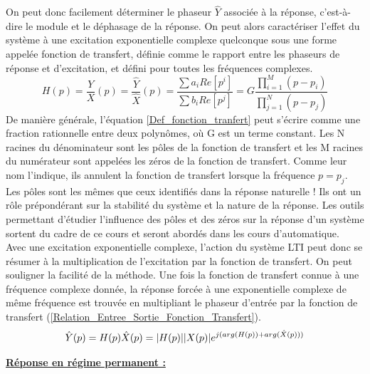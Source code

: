 	On peut donc facilement déterminer le phaseur $\hat{Y}$
        associée à la réponse, c'est-à-dire le module et le déphasage
        de la réponse.  On peut alors caractériser l'effet du système
        à une excitation exponentielle complexe quelconque sous une
        forme appelée fonction de transfert, définie comme le rapport
        entre les phaseurs de réponse et d'excitation, et défini pour
        toutes les fréquences complexes.
	\begin{equation}\label{Def_fonction_tranfert}
          H(p) = \frac{Y}{X} (p) = \frac{\hat Y}{\hat X} (p)= \frac{\sum a_{i}  Re[p^{i}]}{\sum b_{i}  Re[p^{j}]}=G\frac{\prod_{i=1}^{M} (p-p_{i})}{\prod_{j=1}^{N} (p-p_{j})}
	\end{equation}
	De manière générale, l'équation \ref{Def_fonction_tranfert} peut s'écrire comme une fraction rationnelle entre deux polynômes, où G est un terme constant. Les N racines du dénominateur sont les pôles de la fonction de transfert et les M racines du numérateur sont appelées les zéros de la fonction de transfert. Comme leur nom l'indique, ils annulent la fonction de transfert lorsque la fréquence $p=p_{j}$. Les pôles sont les mêmes que ceux identifiés dans la réponse naturelle ! Ils ont un rôle prépondérant sur la stabilité du système et la nature de la réponse. Les outils permettant d'étudier l'influence des pôles et des zéros sur la réponse d'un système sortent du cadre de ce cours et seront abordés dans les cours d'automatique.\\
	
	Avec une excitation exponentielle complexe, l'action du
        système LTI peut donc se résumer à la multiplication de
        l'excitation par la fonction de transfert.  On peut souligner
        la facilité de la méthode. Une fois la fonction de transfert
        connue à une fréquence complexe donnée, la réponse forcée à
        une exponentielle complexe de même fréquence est trouvée en
        multipliant le phaseur d'entrée par la fonction de transfert
        (\ref{Relation_Entree_Sortie_Fonction_Transfert}).
	\begin{equation}\label{Relation_Entree_Sortie_Fonction_Transfert}
          \hat{Y}(p) = H(p) \hat{X}(p)=|H(p)||X(p)|e^{j(arg(H(p))+arg(\hat{X}(p)))}	
	\end{equation}
	
	\vspace{1\baselineskip}
	
	
	\textbf{\underline{Réponse en régime permanent :} }
	
